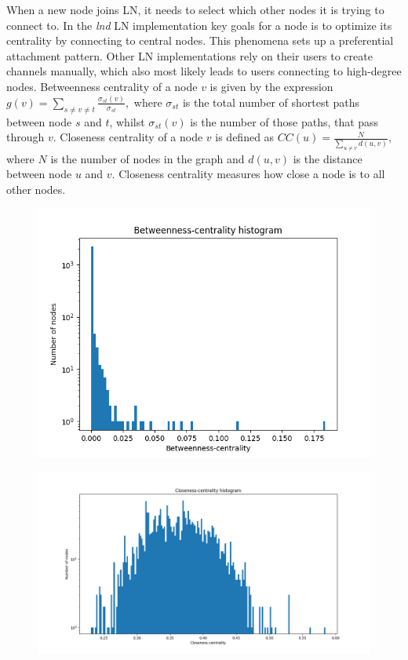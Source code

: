 \documentclass[a4paper]{article}
\theoremstyle{definition}
\begin{document}
When a new node joins LN, it needs to select which other nodes it is trying to connect to. In the \textit{lnd} LN implementation key goals for a node is to optimize its centrality by connecting to central nodes. This phenomena sets up a preferential attachment pattern. Other LN implementations rely on their users to create channels manually, which also most likely leads to users connecting to high-degree nodes. Betweenness centrality of a node $v$ is given by the expression $g(v)=\sum_{s\neq v \neq t}\frac{\sigma_{st}(v)}{\sigma_{st}},$ where $\sigma_{st}$ is the total number of shortest paths between node $s$ and $t$, whilst $\sigma_{st}(v)$ is the number of those paths, that pass through $v$. Closeness centrality  of a node $v$ is defined as $CC(u)=\frac{N}{\sum_{u\neq v}d(u,v)},$ where $N$ is the number of nodes in the graph and $d(u,v)$ is the distance between node $u$ and $v$.  Closeness centrality measures how close a node is to all other nodes. 

\begin{figure}[h]
	\centering
	\begin{minipage}{.6\textwidth}
		\centering
		\includegraphics[width=\linewidth]{betweennessCentrality.png}
		\label{fig:betweennescentrality}
	\end{minipage}%
	\begin{minipage}{.6\textwidth}
		\centering
		\includegraphics[width=\linewidth]{closenessCentrality.png}
		\label{fig:closenesscentrality}
	\end{minipage}
\end{figure}
\end{document}
